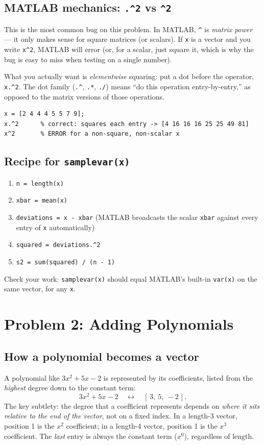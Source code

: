 \documentclass[11pt]{article}
\begin{document}
\subsection*{MATLAB mechanics: \texttt{.\string^2} vs \texttt{\string^2}}
This is the most common bug on this problem. In MATLAB, \texttt{\string^}
is \emph{matrix power} --- it only makes sense for square matrices (or
scalars). If \texttt{x} is a vector and you write \texttt{x\string^2},
MATLAB will error (or, for a scalar, just square it, which is why the bug
is easy to miss when testing on a single number).

What you actually want is \emph{elementwise} squaring: put a dot before
the operator, \texttt{x.\string^2}. The dot family
(\texttt{.\string^}, \texttt{.*}, \texttt{./}) means ``do this operation
entry-by-entry,'' as opposed to the matrix versions of those operations.

\begin{lstlisting}
x = [2 4 4 4 5 5 7 9];
x.^2      % correct: squares each entry -> [4 16 16 16 25 25 49 81]
x^2       % ERROR for a non-square, non-scalar x
\end{lstlisting}

\subsection*{Recipe for \texttt{samplevar(x)}}
\begin{enumerate}
  \item \texttt{n = length(x)}
  \item \texttt{xbar = mean(x)}
  \item \texttt{deviations = x - xbar} \quad(MATLAB broadcasts the scalar
        \texttt{xbar} against every entry of \texttt{x} automatically)
  \item \texttt{squared = deviations.\string^2}
  \item \texttt{s2 = sum(squared) / (n - 1)}
\end{enumerate}
Check your work: \texttt{samplevar(x)} should equal MATLAB's built-in
\texttt{var(x)} on the same vector, for any \texttt{x}.

\section*{Problem 2: Adding Polynomials}

\subsection*{How a polynomial becomes a vector}
A polynomial like $3x^2 + 5x - 2$ is represented by its coefficients,
listed from the \emph{highest} degree down to the constant term:
\[
  3x^2 + 5x - 2 \quad \longleftrightarrow \quad [\,3,\ 5,\ -2\,].
\]
The key subtlety: the degree that a coefficient represents depends on
\emph{where it sits relative to the end of the vector}, not on a fixed
index. In a length-3 vector, position 1 is the $x^2$ coefficient; in a
length-4 vector, position 1 is the $x^3$ coefficient. The \emph{last}
entry is always the constant term ($x^0$), regardless of length.
\end{document}
